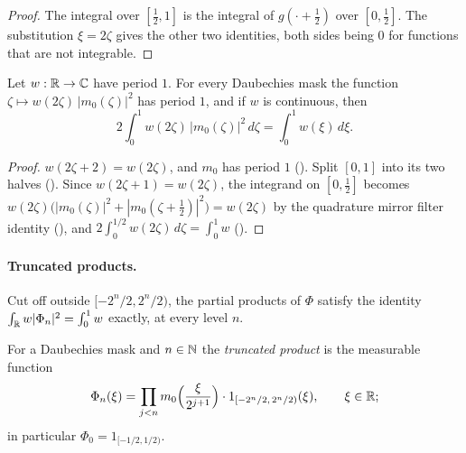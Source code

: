 \begin{proof}
\leanok
The integral over $[\frac12, 1]$ is the integral of $g(\cdot + \frac12)$ over $[0, \frac12]$.
The substitution $\xi = 2\zeta$ gives the other two identities, both sides being $0$ for
functions that are not integrable.
\end{proof}

\begin{lemma}
\label{lem:daub-halving-symbol}
\leanok
{}
Let $w : \mathbb{R} \to \mathbb{C}$ have period $1$. For every Daubechies mask the function
$\zeta \mapsto w(2\zeta) \, |m_0(\zeta)|^2$ has period $1$, and if $w$ is continuous, then
\[
  2 \int_0^1 w(2\zeta) \, |m_0(\zeta)|^2 \, d\zeta = \int_0^1 w(\xi) \, d\xi .
\]
\end{lemma}

\begin{proof}
\leanok
{}
$w(2\zeta + 2) = w(2\zeta)$, and $m_0$ has period $1$ (). Split
$[0, 1]$ into its two halves (). Since $w(2\zeta + 1) = w(2\zeta)$,
the integrand on $[0, \frac12]$ becomes
$w(2\zeta) \bigl(|m_0(\zeta)|^2 + |m_0(\zeta + \frac12)|^2\bigr) = w(2\zeta)$ by the quadrature
mirror filter identity (), and
$2 \int_0^{1/2} w(2\zeta) \, d\zeta = \int_0^1 w$ ().
\end{proof}

\paragraph{Truncated products.}
Cut off outside $[-2^n/2, 2^n/2)$, the partial products of $\Phi$ satisfy the identity
$\int_{\mathbb{R}} w |\Phi_n|^2 = \int_0^1 w$ exactly, at every level $n$.

\begin{definition}
\label{def:daub-trunc-product}
\leanok
{}
For a Daubechies mask and $n \in \mathbb{N}$ the \emph{truncated product} is the measurable function
\[
  \Phi_n(\xi) = \prod_{j<n} m_0\Bigl(\frac{\xi}{2^{j+1}}\Bigr) \cdot 1_{[-2^n/2, \, 2^n/2)}(\xi) ,
  \qquad \xi \in \mathbb{R} ;
\]
in particular $\Phi_0 = 1_{[-1/2, 1/2)}$.
\end{definition}

